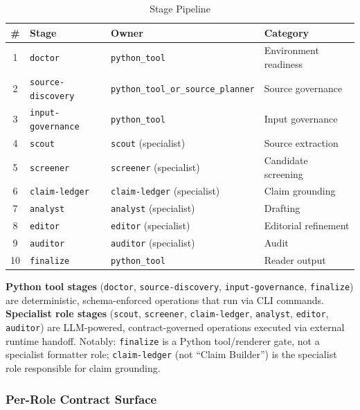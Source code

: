 \documentclass[11pt,a4paper]{article}
\begin{document}
\begin{table}[ht]
\centering
\caption{Stage Pipeline}
\label{tab:stages}
\begin{tabular}{@{}clll@{}}
\toprule
\textbf{\#} & \textbf{Stage} & \textbf{Owner} & \textbf{Category} \\
\midrule
1 & \texttt{doctor} & \texttt{python\_tool} & Environment readiness \\
2 & \texttt{source-discovery} & \texttt{python\_tool\_or\_source\_planner} & Source governance \\
3 & \texttt{input-governance} & \texttt{python\_tool} & Input governance \\
4 & \texttt{scout} & \texttt{scout} (specialist) & Source extraction \\
5 & \texttt{screener} & \texttt{screener} (specialist) & Candidate screening \\
6 & \texttt{claim-ledger} & \texttt{claim-ledger} (specialist) & Claim grounding \\
7 & \texttt{analyst} & \texttt{analyst} (specialist) & Drafting \\
8 & \texttt{editor} & \texttt{editor} (specialist) & Editorial refinement \\
9 & \texttt{auditor} & \texttt{auditor} (specialist) & Audit \\
10 & \texttt{finalize} & \texttt{python\_tool} & Reader output \\
\bottomrule
\end{tabular}
\end{table}

\textbf{Python tool stages} (\texttt{doctor}, \texttt{source-discovery}, \texttt{input-governance}, \texttt{finalize}) are deterministic, schema-enforced operations that run via CLI commands. \textbf{Specialist role stages} (\texttt{scout}, \texttt{screener}, \texttt{claim-ledger}, \texttt{analyst}, \texttt{editor}, \texttt{auditor}) are LLM-powered, contract-governed operations executed via external runtime handoff. Notably: \texttt{finalize} is a Python tool/renderer gate, not a specialist formatter role; \texttt{claim-ledger} (not ``Claim Builder'') is the specialist role responsible for claim grounding.

\subsubsection{Per-Role Contract Surface}
\end{document}
